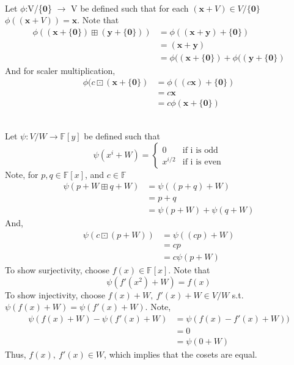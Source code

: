 \documentclass[letterpaper,12pt]{article}
\theoremstyle{definition}
\begin{document}
\\
Let $\phi$:V/\{$\mathbf{0}$\} $\rightarrow$ V be defined such that for each 
$(\mathbf{x}+V) \in V/\{\mathbf{0}\}$ $ \phi( (\mathbf{x} + V) ) = \mathbf{x}$.
Note that 
\begin{align*}
    \phi( (\mathbf{x} + \{\mathbf{0}\})  \boxplus (\mathbf{y} + \{\mathbf{0}\})) & = \phi( (\mathbf{x} + \mathbf{y} ) + \{\mathbf{0}\}) \\
    & = (\mathbf{x} + \mathbf{y})\\
    & = \phi( (\mathbf{x} + \{\mathbf{0}\})  + \phi( (\mathbf{y} + \{\mathbf{0}\})  
\end{align*}
And for scaler multiplication,
\begin{align*}
    \phi(c \boxdot (\mathbf{x} + \{\mathbf{0}\}) & = \phi((c\mathbf{x})+\{\mathbf{0}\})\\
    & = c\mathbf{x}\\
    & = c \phi(\mathbf{x} + \{\mathbf{0}\})
\end{align*}

\\
Let $\psi:V/W \rightarrow \mathbb{F}[y]$ be defined such that \\
\[ \psi(x^i+W) = 
    \begin{cases}
        0 & \text{if i is odd}\\
        x^{i/2} & \text{if i is even}
    \end{cases}
\]
Note, for $p,q \in \mathbb{F}[x]$, and $c \in \mathbb{F}$
\begin{align*}
    \psi(p+W \boxplus q + W) & = \psi( (p+q)+W)\\
    & = p+q \\
    & = \psi(p+W)+\psi(q+W)
\end{align*}
And,
\begin{align*}
    \psi(c\boxdot(p+W)) & = \psi( (c p) +W) \\
    & = c p \\
    & = c \psi(p+W)
\end{align*}
To show surjectivity, choose $f(x) \in \mathbb{F}[x]$. Note that 
\[
    \psi(f'(x^2)+W) = f(x)
\]
To show injectivity, choose $f(x)+W,~f'(x)+W \in V/W$ s.t. $\psi(f(x)+W) = \psi(f'(x)+W)$. Note,
\begin{align*}
    \psi(f(x)+W)-\psi(f'(x)+W) &= \psi(f(x)-f'(x)+W)) \\
    & = 0 \\
    & = \psi( 0 + W )
\end{align*}
Thus, $f(x),~f'(x) \in W$, which implies that the cosets are equal. 
\end{document}
